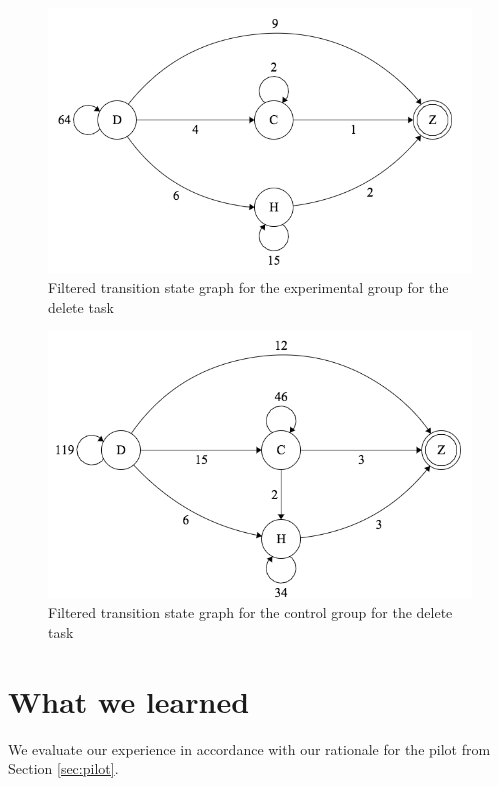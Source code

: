 \documentclass[11pt,letterpaper]{article}
\begin{document}
\begin{figure}
\centering
\includegraphics[scale=0.38]{figures/exp-filtered.png}
\caption{Filtered transition state graph for the experimental group for the delete task}
\label{fig:exp-filtered}
\end{figure}

\begin{figure}
\centering
\includegraphics[scale=0.38]{figures/control-filtered.png}
\caption{Filtered transition state graph for the control group for the delete task}
\label{fig:control-filtered}
\end{figure}

\section{What we learned}
\label{sec:learned}

We evaluate our experience in accordance with our rationale for the pilot from Section \ref{sec:pilot}.
\end{document}
